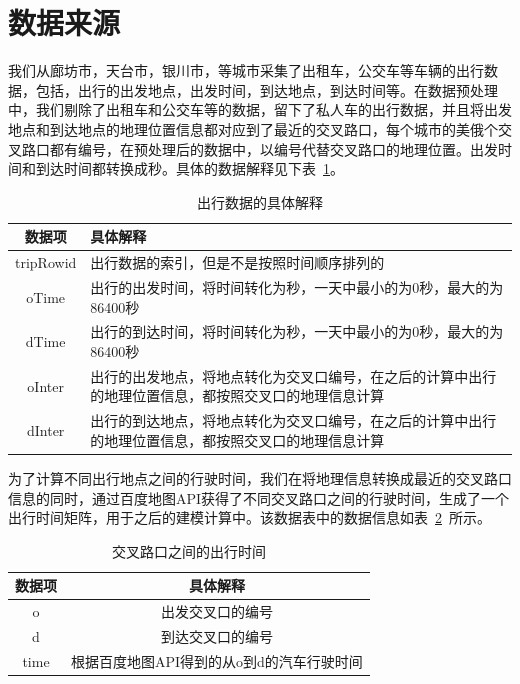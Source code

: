 \section{数据来源}
我们从廊坊市，天台市，银川市，等城市采集了出租车，公交车等车辆的出行数据，包括，出行的出发地点，出发时间，到达地点，到达时间等。在数据预处理中，我们剔除了出租车和公交车等的数据，留下了私人车的出行数据，并且将出发地点和到达地点的地理位置信息都对应到了最近的交叉路口，每个城市的美俄个交叉路口都有编号，在预处理后的数据中，以编号代替交叉路口的地理位置。出发时间和到达时间都转换成秒。具体的数据解释见下表~\ref{tab:triplist}。
\begin{table}
    \centering
    \caption{出行数据的具体解释}
    \label{tab:triplist}
  \begin{tabular}{|c|p{10cm}|}
    \hline
    数据项 & 具体解释\\
    \hline \hline 
    tripRowid & 出行数据的索引，但是不是按照时间顺序排列的\\
    \hline 
    oTime & 出行的出发时间，将时间转化为秒，一天中最小的为0秒，最大的为86400秒\\
    \hline 
    dTime & 出行的到达时间，将时间转化为秒，一天中最小的为0秒，最大的为86400秒\\
    \hline 
    oInter & 出行的出发地点，将地点转化为交叉口编号，在之后的计算中出行的地理位置信息，都按照交叉口的地理信息计算\\
    \hline 
    dInter & 出行的到达地点，将地点转化为交叉口编号，在之后的计算中出行的地理位置信息，都按照交叉口的地理信息计算\\
    \hline 
  \end{tabular}
\end{table}

\par
为了计算不同出行地点之间的行驶时间，我们在将地理信息转换成最近的交叉路口信息的同时，通过百度地图API获得了不同交叉路口之间的行驶时间，生成了一个出行时间矩阵，用于之后的建模计算中。该数据表中的数据信息如表~\ref{tab:odtime}~所示。

\begin{table}
  \centering
  \caption{交叉路口之间的出行时间}
  \label{tab:odtime}
  \begin{tabular}{|c|c|}
  \hline 
  数据项 & 具体解释\\
  \hline \hline 
  o & 出发交叉口的编号\\
  \hline 
  d & 到达交叉口的编号\\
  \hline 
  time & 根据百度地图API得到的从o到d的汽车行驶时间\\
  \hline 
  \end{tabular}
\end{table}

